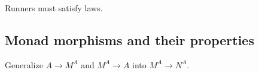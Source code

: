 Runners must satisfy laws.

\subsection{Monad morphisms and their properties}

Generalize $A\rightarrow M^{A}$ and $M^{A}\rightarrow A$ into $M^{A}\rightarrow N^{A}$.

\begin{comment}
this is part two of chapter seven in part one we have looked at several
examples of Mona\textsf{'}s and we found that generalizing the monad type signature
led to very different types there are different properties of containers
some of them expressed iteration other expressed failures recovery
from flavors evaluation strategies and soon in this part I will talk
in more detail about the laws and structure of these containers of
these types and we will see why is it that flatmap type signature
which is kind of a little strange and bizarre maybe at first sight
gives rise to such a generalization we'll see that the properties
of Mona\textsf{'}s are completely logically the derived from the properties
that the computations must have so let us think back to our examples
of Thunder block programs and let\textsf{'}s for simplicity consider that we
are talking about the container such as list where the functor block
let\textsf{'}s say of this kind expresses iteration over a list so we have
been here for example in nested iteration of some sort what will be
the properties of counter block programs that we expect to have the
main intuition is that when we write a line like this with the left
arrow which is in scala called a generator we expect that in the later
lines the value of x will go over items that are held in the container
see this is our main intuition so in particular we expect that if
we first say that X goes over items in container 1 and then we make
some transformation of that X let\textsf{'}s say using a function f then we
expect and then we continue with that in some other way with some
other generator we expect that the result will be the same as if we
first transformed container 1 and replaced all its items by the transformed
items by the f of X and then continued so so in other words we expect
that this code and whatever follows it should be equivalent to this
code and whatever follows it now if you remember the main intuition
behind how to interpret the generator lines each generator line together
with all the code that follows it defines a new container which would

\end{comment}
